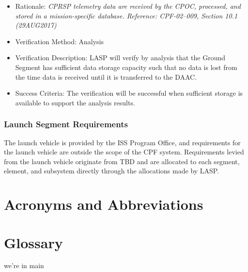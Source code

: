 \documentclass[12pt,oneside,oldfontcommands]{memoir}
\renewcommand{\entryname}{Acronym}
\renewcommand{\descriptionname}{Complete Term}
\def\bibliostyle{plain}
\begin{document}
\begin{itemize}
\item{} Rationale: \emph{CPRSP telemetry data are received by the CPOC, processed, and stored in a mission-specific database. Reference: CPF-02--009, Section 10.1 (29AUG2017)}

\item{} Verification Method: Analysis

\item{} Verification Description: \gls{LASP} will verify by \gls{analysis} that the Ground Segment has sufficient data storage capacity such that no data is lost from the time data is received until it is transferred to the \gls{DAAC}.

\item{} Success Criteria: The verification will be successful when sufficient storage is available to support the \gls{analysis} results.

\end{itemize}

\subsection{Launch Segment Requirements}
\label{launchsegmentrequirements}

The launch vehicle is provided by the \gls{ISS} Program Office, and requirements for the launch vehicle are outside the scope of the \gls{CPF} system. Requirements levied from the launch vehicle originate from TBD\label{tbx_2} and are allocated to each segment, element, and subsystem directly through the allocations made by \gls{LASP}.


\begin{appendices}


\chapter{Acronyms and Abbreviations  }
\label{sec_acros}

\printglossary[type=\acronymtype]

\chapter{Glossary  }
\label{sec_gls}


\renewcommand{\entryname}{Term}
\renewcommand{\descriptionname}{Definition}
\printglossary


\end{appendices}

% 
%
%


\if@mainmatter
	we're in main
	\backmatter
\fi



\ifx\bibliocommand\undefined
\else
	
	\bibliocommand
\fi






\end{document}
